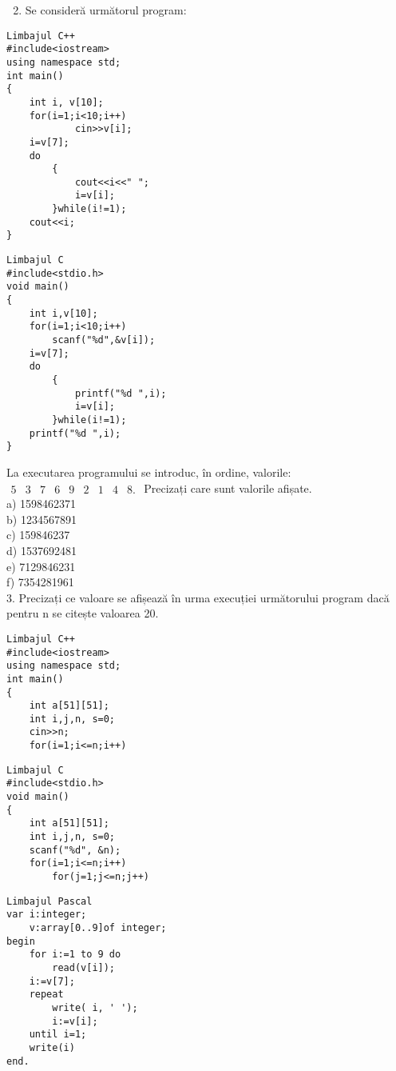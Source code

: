 \begin{enumerate}
  \setcounter{enumi}{1}
  \item Se consideră următorul program:
\end{enumerate}

\begin{verbatim}
Limbajul C++
#include<iostream>
using namespace std;
int main()
{
    int i, v[10];
    for(i=1;i<10;i++)
            cin>>v[i];
    i=v[7];
    do
        {
            cout<<i<<" ";
            i=v[i];
        }while(i!=1);
    cout<<i;
}
\end{verbatim}

\begin{verbatim}
Limbajul C
#include<stdio.h>
void main()
{
    int i,v[10];
    for(i=1;i<10;i++)
        scanf("%d",&v[i]);
    i=v[7];
    do
        {
            printf("%d ",i);
            i=v[i];
        }while(i!=1);
    printf("%d ",i);
}
\end{verbatim}

La executarea programului se introduc, în ordine, valorile: $\begin{array}{lllllllll}5 & 3 & 7 & 6 & 9 & 2 & 1 & 4 & 8 .\end{array}$ Precizați care sunt valorile afișate.\\
a) 1598462371\\
b) 1234567891\\
c) 159846237\\
d) 1537692481\\
e) 7129846231\\
f) 7354281961\\
3. Precizați ce valoare se afișează în urma execuției următorului program dacă pentru n se citește valoarea 20.

\begin{verbatim}
Limbajul C++
#include<iostream>
using namespace std;
int main()
{
    int a[51][51];
    int i,j,n, s=0;
    cin>>n;
    for(i=1;i<=n;i++)
\end{verbatim}

\begin{verbatim}
Limbajul C
#include<stdio.h>
void main()
{
    int a[51][51];
    int i,j,n, s=0;
    scanf("%d", &n);
    for(i=1;i<=n;i++)
        for(j=1;j<=n;j++)
\end{verbatim}

\begin{verbatim}
Limbajul Pascal
var i:integer;
    v:array[0..9]of integer;
begin
    for i:=1 to 9 do
        read(v[i]);
    i:=v[7];
    repeat
        write( i, ' ');
        i:=v[i];
    until i=1;
    write(i)
end.
\end{verbatim}

